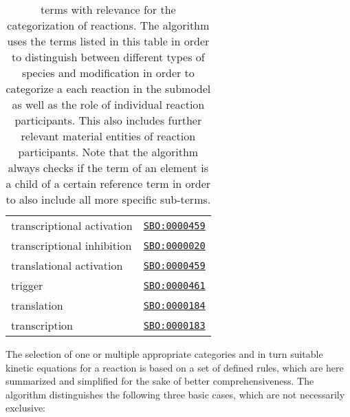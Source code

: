 \begin{SCtable}
\begin{tabular}{ll}
transcriptional activation & \href{http://identifiers.org/biomodels.sbo/SBO:0000459}{\texttt{SBO:0000459}}\\
transcriptional inhibition & \href{http://identifiers.org/biomodels.sbo/SBO:0000020}{\texttt{SBO:0000020}}\\
translational activation   & \href{http://identifiers.org/biomodels.sbo/SBO:0000459}{\texttt{SBO:0000459}}\\
trigger                    & \href{http://identifiers.org/biomodels.sbo/SBO:0000461}{\texttt{SBO:0000461}}\\
translation                & \href{http://identifiers.org/biomodels.sbo/SBO:0000184}{\texttt{SBO:0000184}}\\
transcription              & \href{http://identifiers.org/biomodels.sbo/SBO:0000183}{\texttt{SBO:0000183}}\\
\bottomrule
\end{tabular}
\caption[\SBO terms with relevance for the categorization of reactions]{\SBO terms with relevance for the categorization of reactions.
The algorithm uses the \SBO terms listed in this table in order to distinguish between different types of species and modification in order to categorize a each reaction in the submodel as well as the role of individual reaction participants.
This also includes further relevant material entities of reaction participants.
Note that the algorithm always checks if the \SBO term of an element is a child of a certain reference term in order to also include all more specific sub-terms.}
\label{tab:FurtherRelevantSBOTerms}
\end{SCtable}
%
The selection of one or multiple appropriate categories and in turn suitable kinetic equations for a reaction is based on a set of defined rules, which are here summarized and simplified for the sake of better comprehensiveness.
%
The algorithm distinguishes the following three basic cases, which are not necessarily exclusive:
